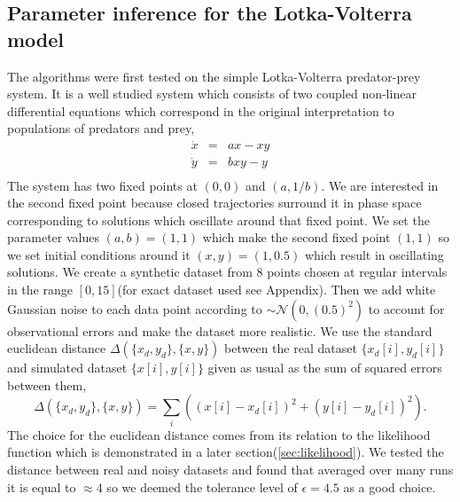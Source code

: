 \subsection{Parameter inference for the Lotka-Volterra model}
The algorithms were first tested on the simple Lotka-Volterra predator-prey system\cite[] {lotka1925elements}. It is a well studied system which consists of two coupled non-linear differential equations which correspond in the original interpretation to populations of predators and prey, 
\begin{equation}
\begin{array}{lcl}
\dot x &=& ax - xy \\
\dot y &=& bxy - y \\
\end{array}
\end{equation}
The system has two fixed points at $(0, 0)$ and $(a, 1/b)$. We are interested in the second fixed point because closed trajectories surround it in phase space corresponding to solutions which oscillate around that fixed point. We set the parameter values $(a,b) = (1,1)$ which make the second fixed point $(1, 1)$ so we set initial conditions around it $(x,y) = (1, 0.5)$ which result in oscillating solutions. We create a synthetic dataset from 8 points chosen at regular intervals in the range $[0, 15]$(for exact dataset used see Appendix). Then we add white Gaussian noise to each data point according to $\sim \mathcal{N}(0,(0.5)^2)$ to account for observational errors and make the dataset more realistic. We use the standard euclidean distance $\Delta(\{x_d, y_d\}, \{x, y\})$ between the real dataset $\{x_d[i], y_d[i]\}$ and simulated dataset $\{x[i], y[i]\}$ given as usual as the sum of squared errors between them,
\begin{equation}
\Delta(\{x_d, y_d\}, \{x, y\}) = \sum_{i}\left((x[i] - x_d[i] )^2 + (y[i]-y_d[i])^2\right).
\end{equation}
The choice for the euclidean distance comes from its relation to the likelihood function which is demonstrated in a later section(\ref{sec:likelihood}). We tested the distance between real and noisy datasets and found that averaged over many runs it is equal to $\approx 4$ so we deemed the tolerance level of $\epsilon=4.5$ as a good choice. 

